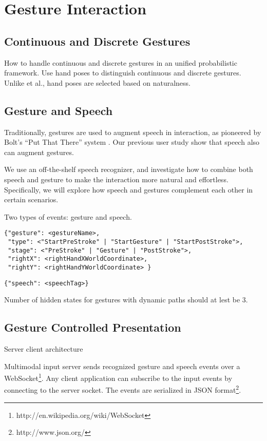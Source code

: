 \chapter{Gesture Interaction}
\section{Continuous and Discrete Gestures}
How to handle continuous and discrete gestures in an unified probabilistic
framework. Use hand poses to distinguish continuous and discrete gestures.
Unlike \cite{Oka02} et al., hand poses are selected based on naturalness.

\section{Gesture and Speech}
Traditionally, gestures are used to augment speech in interaction, as pioneered
by Bolt's ``Put That There'' system \cite{Bolt80}. Our previous user study
\cite{yin10thesis} show that speech also can augment gestures.

We use an off-the-shelf speech 
recognizer, and investigate how to combine both speech and gesture to make
the interaction more natural and effortless. Specifically, we will explore how speech and gestures complement each other in certain scenarios.

Two types of events: gesture and speech.

\begin{lstlisting}[caption=Gesture event JSON object]
{"gesture": <gestureName>, 
 "type": <"StartPreStroke" | "StartGesture" | "StartPostStroke">,
 "stage": <"PreStroke" | "Gesture" | "PostStroke">,
 "rightX": <rightHandXWorldCoordinate>,
 "rightY": <rightHandYWorldCoordinate> } 
\end{lstlisting}

\begin{lstlisting}[caption=Speech event JSON object]
{"speech": <speechTag>}
\end{lstlisting}

Number of hidden states for gestures with dynamic paths should at lest be 3.

\section{Gesture Controlled Presentation}
Server client architecture

Multimodal input server sends recognized gesture and speech events over a
WebSocket\footnote{http://en.wikipedia.org/wiki/WebSocket}. Any client
application can subscribe to the input events by connecting to the server
socket. The events are serialized in JSON format\footnote{http://www.json.org/}. 
